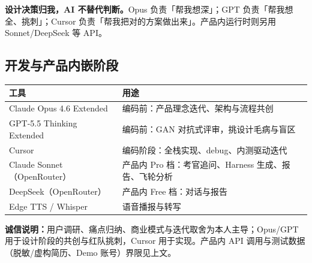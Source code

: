\documentclass[11pt, a4paper]{article}
\begin{document}
\begin{keypoint}[分工原则]
\textbf{设计决策归我，AI 不替代判断。}Opus 负责「帮我想深」；GPT 负责「帮我想全、挑刺」；Cursor 负责「帮我把对的方案做出来」。产品内运行时则另用 Sonnet/DeepSeek 等 API。
\end{keypoint}

\subsection{开发与产品内嵌阶段}

\begin{tabularx}{\textwidth}{@{}l X@{}}
\toprule
\textbf{工具} & \textbf{用途} \\
\midrule
Claude Opus 4.6 Extended & 编码前：产品理念迭代、架构与流程共创 \\
GPT-5.5 Thinking Extended & 编码前：GAN 对抗式评审，挑设计毛病与盲区 \\
Cursor & 编码阶段：全栈实现、debug、内测驱动迭代 \\
Claude Sonnet（OpenRouter） & 产品内 Pro 档：考官追问、Harness 生成、报告、飞轮分析 \\
DeepSeek（OpenRouter） & 产品内 Free 档：对话与报告 \\
Edge TTS / Whisper & 语音播报与转写 \\
\bottomrule
\end{tabularx}

\vspace{0.3em}
\noindent\textbf{诚信说明：}用户调研、痛点归纳、商业模式与迭代取舍为本人主导；Opus/GPT 用于设计阶段的共创与红队挑刺，Cursor 用于实现。产品内 API 调用与测试数据（脱敏/虚构简历、Demo 账号）界限见上文。
\end{document}
